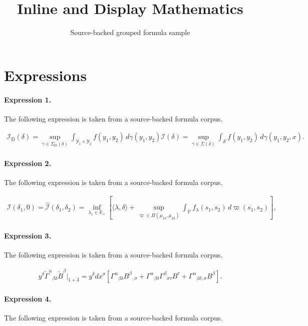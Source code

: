 \documentclass[11pt]{article}
\title{Inline and Display Mathematics}
\author{Source-backed grouped formula sample}
\date{}
\begin{document}
\maketitle
\section{Expressions}
\paragraph{Expression 1.} The following expression is taken from a source-backed formula corpus.

\begin{align*}\mathcal{I}_{\mathrm{D} }(\delta) = \sup_{\gamma \in \Sigma_{\mathrm{D} }(\delta)} \int_{\mathcal{Y}_1 \times \mathcal{Y}_2} f(y_1, y_2) \, d \gamma(y_1, y_2) \mathcal{I}(\delta) = \sup_{\gamma \in \Sigma(\delta)} \int_{\mathcal{S}} f(y_1, y_2) \, d \gamma(y_1, y_2, x).\end{align*}

\paragraph{Expression 2.} The following expression is taken from a source-backed formula corpus.

\begin{align*}\mathcal{I}(\delta_1, 0) = \widehat{\mathcal{I}} (\delta_1, \delta_2) = \inf _{\lambda_1 \in \mathbb{R}_{+}}\left[\langle\lambda, \delta\rangle +\sup _{\varpi \in \Pi\left(\mu_{13}, \mu_{23}\right)} \int_{\mathcal{V}} f_{\lambda}(s_1, s_2) \, d \varpi(s_1,s_2) \right] ,\end{align*}

\paragraph{Expression 3.} The following expression is taken from a source-backed formula corpus.

\begin{align*}y^\delta \tilde{\Gamma}^\alpha {}_{\beta \delta }\tilde{B}^\beta|_{1+3}=y^\delta dx^\sigma [\Gamma ^\alpha {}_{\beta \delta }B^\beta{}_{,\sigma }+\Gamma ^\alpha {}_{\beta \delta }\Gamma ^\beta {}_{\sigma \tau}B^\tau +\Gamma ^\alpha {}_{\beta \delta ,\sigma }B^\beta ]. \end{align*}

\paragraph{Expression 4.} The following expression is taken from a source-backed formula corpus.
\end{document}
